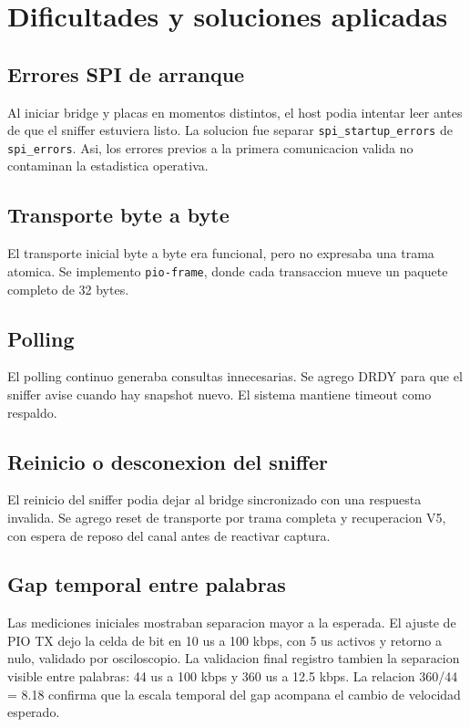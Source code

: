 \documentclass[12pt,a4paper,oneside]{report}
\begin{document}
\chapter{Dificultades y soluciones aplicadas}

\section{Errores SPI de arranque}

Al iniciar bridge y placas en momentos distintos, el host podia intentar leer
antes de que el sniffer estuviera listo. La solucion fue separar
\texttt{spi\_startup\_errors} de \texttt{spi\_errors}. Asi, los errores previos
a la primera comunicacion valida no contaminan la estadistica operativa.

\section{Transporte byte a byte}

El transporte inicial byte a byte era funcional, pero no expresaba una trama
atomica. Se implemento \texttt{pio-frame}, donde cada transaccion mueve un
paquete completo de 32 bytes.

\section{Polling}

El polling continuo generaba consultas innecesarias. Se agrego DRDY para que
el sniffer avise cuando hay snapshot nuevo. El sistema mantiene timeout como
respaldo.

\section{Reinicio o desconexion del sniffer}

El reinicio del sniffer podia dejar al bridge sincronizado con una respuesta
invalida. Se agrego reset de transporte por trama completa y recuperacion V5,
con espera de reposo del canal antes de reactivar captura.

\section{Gap temporal entre palabras}

Las mediciones iniciales mostraban separacion mayor a la esperada. El ajuste de
PIO TX dejo la celda de bit en 10 us a 100 kbps, con 5 us activos y retorno a
nulo, validado por osciloscopio. La validacion final registro tambien la
separacion visible entre palabras: 44 us a 100 kbps y 360 us a 12.5 kbps. La
relacion 360/44 = 8.18 confirma que la escala temporal del gap acompana el
cambio de velocidad esperado.
\end{document}

